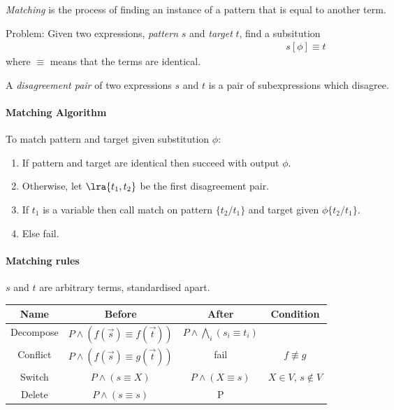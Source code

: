 \documentclass{article}
\begin{document}
\begin{definition}
	\emph{Matching} is the process of finding an instance of a pattern that is equal to another term.

	Problem: Given two expressions, \emph{pattern} $s$ and \emph{target} $t$, find a subsitution
	\begin{align*}
		s[\phi] \equiv t
	\end{align*}
	where $\equiv$ means that the terms are identical.
\end{definition}

\begin{definition}
	A \emph{disagreement pair} of two expressions $s$ and $t$ is a pair of subexpressions
	which disagree.
\end{definition}

\paragraph{Matching Algorithm}

To match pattern and target given substitution $\phi$:

\begin{enumerate}
	\item If pattern and target are identical then succeed with output $\phi$.
	\item Otherwise, let $\lra{t_1, t_2}$ be the first disagreement pair.
	\item If $t_1$ is a variable then call match on pattern $\{t_2/t_1\}$ and target given $\phi\{t_2/t_1\}$.
	\item Else fail.
\end{enumerate}

\paragraph*{Matching rules}
$s$ and $t$ are arbitrary terms, standardised apart.
\begin{center}
	\begin{tabular}{c | c | c | c}
		\textbf{Name} & \textbf{Before}                        & \textbf{After}                        & \textbf{Condition}     \\\hline
		Decompose     & $P\wedge (f(\vec s) \equiv f(\vec t))$ & $P\wedge\bigwedge_i (s_i \equiv t_i)$ &                        \\\hline
		Conflict      & $P\wedge (f(\vec s) \equiv g(\vec t))$ & fail                                  & $f\not\equiv g$        \\\hline
		Switch        & $P\wedge (s\equiv X)$                  & $P\wedge(X\equiv s)$                  & $X\in V$, $s\not\in V$ \\\hline
		Delete        & $P\wedge (s\equiv s)$                  & P                                     &
	\end{tabular}
\end{center}
\end{document}
